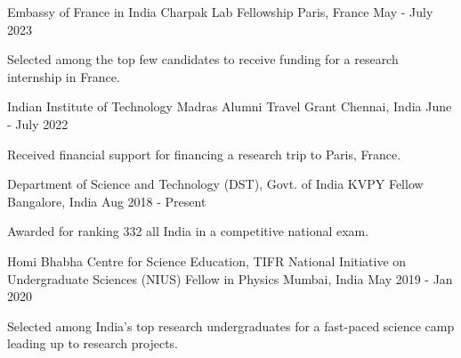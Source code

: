 

\begin{cventries}
  
  \cventry
    {Embassy of France in India} %
    {Charpak Lab Fellowship} %
    {Paris, France} %
    {May - July 2023} %
    {
      \begin{cvitems} %
        \item {Selected among the top few candidates to receive funding for a research internship in France.}
      \end{cvitems}
    }

  \cventry
    {Indian Institute of Technology Madras} %
    {Alumni Travel Grant} %
    {Chennai, India} %
    {June - July 2022} %
    {
      \begin{cvitems} %
        \item {Received financial support for financing a research trip to Paris, France.}
      \end{cvitems}
    }

  \cventry
    {Department of Science and Technology (DST), Govt. of India} %
    {KVPY Fellow} %
    {Bangalore, India} %
    {Aug 2018 - Present} %
    {
      \begin{cvitems} %
        \item {Awarded for ranking 332 all India in a competitive national exam.}
      \end{cvitems}
    }



  \cventry
    {Homi Bhabha Centre for Science Education, TIFR} %
    {National Initiative on Undergraduate Sciences (NIUS) Fellow in Physics} %
    {Mumbai, India} %
    {May 2019 - Jan 2020} %
    {
      \begin{cvitems} %
        \item {Selected among India's top research undergraduates for a fast-paced science camp leading up to research projects.}
      \end{cvitems}
    }




\end{cventries}
